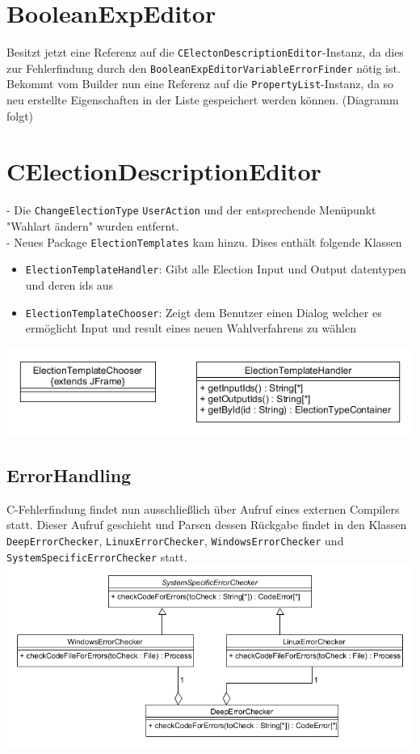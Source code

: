 \documentclass[a4paper]{scrreprt}
\begin{document}
\section{BooleanExpEditor}
Besitzt jetzt eine Referenz auf die \verb!CElectonDescriptionEditor!-Instanz, da dies zur Fehlerfindung durch den \verb!BooleanExpEditorVariableErrorFinder! nötig ist.
\newline
Bekommt vom Builder nun eine Referenz auf die \verb!PropertyList!-Instanz, da so neu erstellte Eigenschaften in der Liste gespeichert werden können.
\newline
(Diagramm folgt)
\newline

\section{CElectionDescriptionEditor}

- Die \verb!ChangeElectionType! \verb!UserAction! und der entsprechende Menüpunkt "Wahlart ändern" wurden entfernt. \\
- Neues Package \verb!ElectionTemplates! kam hinzu. Dises enthält folgende Klassen\\
\begin{itemize}
\item \verb!ElectionTemplateHandler!: Gibt alle Election Input und Output datentypen und deren ids aus
\item \verb!ElectionTemplateChooser!: Zeigt dem Benutzer einen Dialog welcher es ermöglicht Input und result eines neuen Wahlverfahrens zu wählen
\end{itemize}
\includegraphics[scale=0.5]{ElectionTemplates.png}\\

\subsection{ErrorHandling}
C-Fehlerfindung findet nun ausschließlich über Aufruf eines externen Compilers statt. Dieser Aufruf geschieht und Parsen dessen Rückgabe findet in den Klassen \verb!DeepErrorChecker!, \verb!LinuxErrorChecker!, \verb!WindowsErrorChecker! und \verb!SystemSpecificErrorChecker! statt.
\includegraphics[scale=0.5]{CErrorChecking.png}
\end{document}
